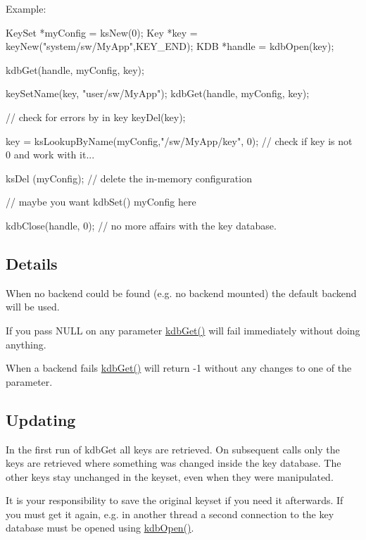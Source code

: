 \begin{DoxyParagraph}{Example:}

\begin{DoxyCode}
KeySet *myConfig = ksNew(0);
Key *key = keyNew("system/sw/MyApp",KEY_END);
KDB *handle = kdbOpen(key);

kdbGet(handle, myConfig, key);

keySetName(key, "user/sw/MyApp");
kdbGet(handle, myConfig, key);

// check for errors by in key
keyDel(key);

key = ksLookupByName(myConfig,"/sw/MyApp/key", 0);
// check if key is not 0 and work with it...

ksDel (myConfig); // delete the in-memory configuration


// maybe you want kdbSet() myConfig here

kdbClose(handle, 0); // no more affairs with the key database.
\end{DoxyCode}

\end{DoxyParagraph}
\hypertarget{group__kdb_kdbgetdetail}{}\subsection{Details}\label{group__kdb_kdbgetdetail}
When no backend could be found (e.g. no backend mounted) the default backend will be used.

If you pass NULL on any parameter \hyperlink{group__kdb_ga28e385fd9cb7ccfe0b2f1ed2f62453a1}{kdbGet()} will fail immediately without doing anything.

When a backend fails \hyperlink{group__kdb_ga28e385fd9cb7ccfe0b2f1ed2f62453a1}{kdbGet()} will return -\/1 without any changes to one of the parameter.\hypertarget{group__kdb_kdbgetupdate}{}\subsection{Updating}\label{group__kdb_kdbgetupdate}
In the first run of kdbGet all keys are retrieved. On subsequent calls only the keys are retrieved where something was changed inside the key database. The other keys stay unchanged in the keyset, even when they were manipulated.

It is your responsibility to save the original keyset if you need it afterwards. If you must get it again, e.g. in another thread a second connection to the key database must be opened using \hyperlink{group__kdb_ga6808defe5870f328dd17910aacbdc6ca}{kdbOpen()}.


